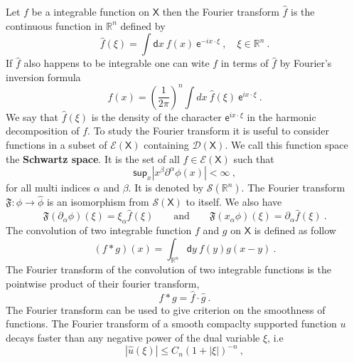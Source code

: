 \documentclass[10pt]{book}
\newcommand{\abs}[1]{\left|#1\right|}
\renewcommand{\sup}{\mathsf{sup}}
\let\int\int
\newcommand{\Dcal}{\mathcal{D}}
\newcommand{\Ecal}{\mathcal{E}}
\newcommand{\Scal}{\mathcal{S}}
\newcommand{\Rbb}{\mathbb{R}}
\newcommand{\Frak}{\mathfrak{F}}
\newcommand{\Xsf}{\mathsf{X}}
\newcommand{\dsf}{\mathsf{d}}
\newcommand{\esf}{\mathsf{e}}
\theoremstyle{break}
\begin{document}
Let $f$ be a integrable function on $\Xsf$ then the Fourier transform $\hat{f}$ is the continuous function in $\Rbb^n$ defined by
%
\begin{equation*}
\hat{f}(\xi) = \int \dsf x \ f(x) \ \esf^{-i x \cdot \xi} \ , \quad \xi \in \Rbb^n \ .
\end{equation*}
%
If $\hat{f}$ also happens to be integrable one can wite $f$ in terms of $\hat{f}$ by Fourier's inversion formula
%
\begin{equation*}
f(x) = \left(\frac{1}{2\pi}\right)^n \int dx \ \hat{f}(\xi) \ \esf^{i x \cdot \xi} \ .
\end{equation*}
%
We say that $\hat{f}(\xi)$ is the density of the character $\esf^{i x \cdot \xi}$ in the harmonic decomposition of $f$. To study the Fourier transform it is useful to consider functions in a subset of $\Ecal(\Xsf)$ containing $\Dcal(\Xsf)$. We call this function space the \textbf{Schwartz space}. It is the set of all $f \in \Ecal(\Xsf)$ such that 
%
\begin{equation*}
\sup_x \abs{x^\beta \partial^\alpha \phi(x)} < \infty \ ,
\end{equation*}
%
for all multi indices $\alpha$ and $\beta$. It is denoted by $\Scal(\Rbb^n)$. The Fourier transform $\Frak : \phi \to \hat{\phi}$ is an isomorphism from $\Scal(\Xsf)$ to itself. We also have 
%
\begin{equation*}
\Frak(\partial_\alpha \phi)(\xi) = \xi_\alpha \hat{f}(\xi) \qquad \mbox{and} \qquad \Frak(x_\alpha \phi)(\xi) = \partial_\alpha \hat{f}(\xi) \ .
\end{equation*}
%
The convolution of two integrable function $f$ and $g$ on $\Xsf$ is defined as follow
%
\begin{equation*}
( f \ast g )(x) = \int_{\Rbb^n} \dsf y \ f(y) g(x-y) \ .
\end{equation*}
%
The Fourier transform of the convolution of two integrable functions is the pointwise product of their fourier transform,
%
\begin{equation*}
f \ast g = \hat{f} \cdot \hat{g} \ . 
\end{equation*}
%
The Fourier transform can be used to give criterion on the smoothness of functions. The Fourier transform of a smooth compaclty supported function $u$ decays faster than any negative power of the dual variable $\xi$, i.e
%
\begin{equation}
\abs{\hat{u}(\xi)} \leq C_n (1+\abs{\xi})^{-n} \ ,
\label{eq:crit_smooth_fourier}
\end{equation}
\end{document}

